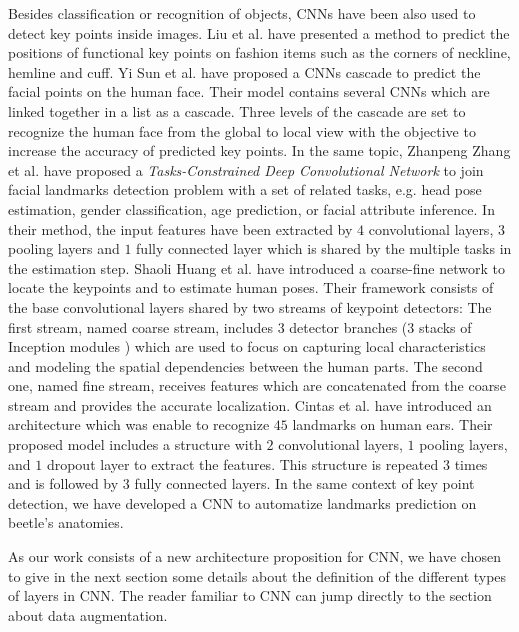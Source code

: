 \documentclass[review]{elsarticle}
\begin{document}
Besides classification or recognition of objects, CNNs have been also used to detect key points inside images. Liu et al. \cite{liu2016fashion} have presented a method to predict the positions of functional key points on fashion items such as the corners of neckline, hemline and cuff. Yi Sun et al. \cite{sun2013deep} have proposed a CNNs cascade to predict the facial points on the human face. 
Their model contains several CNNs which are linked together in a list as a cascade. Three levels of the cascade are set to recognize the human face from the global to local view with the objective to increase the accuracy of predicted key points. In the same topic, Zhanpeng Zhang et al. \cite{zhang2014facial} have proposed a \textit{Tasks-Constrained Deep Convolutional Network} to join facial landmarks detection problem with a set of related tasks, e.g. head pose estimation, gender classification, age prediction, or facial attribute inference. In their method, the input features have been extracted by $4$ convolutional layers, $3$ pooling layers and $1$ fully connected layer which is shared by the multiple tasks in the estimation step. Shaoli Huang et al. \cite{huang2017coarse} have introduced a coarse-fine network to locate the keypoints and to estimate human poses. Their framework consists of the base convolutional layers shared by two streams of keypoint detectors: The first stream, named coarse stream, includes $3$ detector branches (3 stacks of Inception modules \cite{szegedy2015going}) which are used to focus on capturing local characteristics and modeling the spatial dependencies between the human parts. The second one, named fine stream, receives features which are concatenated from the coarse stream and provides the accurate localization. Cintas et al. \cite{cintas2016automatic} have introduced an architecture which was enable to recognize $45$ landmarks on human ears. Their proposed model includes a structure with $2$ convolutional layers, $1$ pooling layers, and $1$ dropout layer to extract the features. This structure is repeated $3$ times and is followed by 3 fully connected layers. In the same context of key point detection, we have developed a CNN to automatize landmarks prediction on beetle's anatomies. 

As our work consists of a new architecture proposition for CNN, we have chosen to give in the next section some details about the definition of the different types of layers in CNN. The reader familiar to CNN can jump directly to the section about data augmentation.
\end{document}
